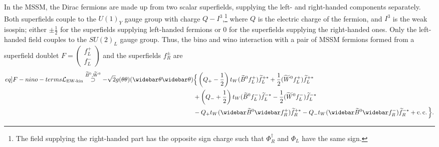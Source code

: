 \documentclass[english, notitlepage]{article}
\begin{document}
            In the MSSM, the Dirac fermions are made up from two scalar superfields, supplying the left- and right-handed components separately.
            Both superfields couple to the ${U(1)}_Y$ gauge group with charge $Q-I^3$,\footnote{The field supplying the right-handed part has the opposite sign charge such that $\Phi^\dag_R$ and $\Phi_L$ have the same sign.}
            where $Q$ is the electric charge of the fermion, and $I^3$ is the weak isospin; either $\pm \frac{1}{2}$ for the superfields supplying left-handed fermions or 0 for the superfields supplying the right-handed ones.
            Only the left-handed field couples to the ${SU(2)}_L$ gauge group.
            Thus, the bino and wino interaction with a pair of MSSM fermions formed from a superfield doublet $F = \begin{pmatrix} f_L^+ \\ f_L^- \end{pmatrix}$ and the superfields $f_R^\pm$ are
            \begin{align}
                \label[eq]{F-nino-terms}
                \nonumber
                \L_{\text{EW-kin}} \stackrel{\bino, \wino}{\supset} -\sqrt{2} g (\theta\theta)(\wbar\theta\wbar\theta) & \Big\{ \pclosed{Q_+-\frac{1}{2}}t_W (\bino f_L^+) \wtilde{f}_L^{+*} + \frac{1}{2} (\wino f_L^+) \wtilde{f}_L^{+*}                     \\ \nonumber
                                                                                                                       & + \pclosed{Q_-+\frac{1}{2}}t_W (\bino f_L^-)\wtilde{f}_L^{-*} - \frac{1}{2} (\wino f_L^-)\wtilde{f}_L^{-*}                            \\
                                                                                                                       & - Q_+t_W (\wbar{\wtilde{B}}^0\wbar{f}_R^+)\wtilde{f}_R^{+*} - Q_-t_W (\wbar{\wtilde{B}}^0\wbar{f}_R^-)\wtilde{f}_R^{-*} + \cc \Big\}.
            \end{align}
\end{document}
